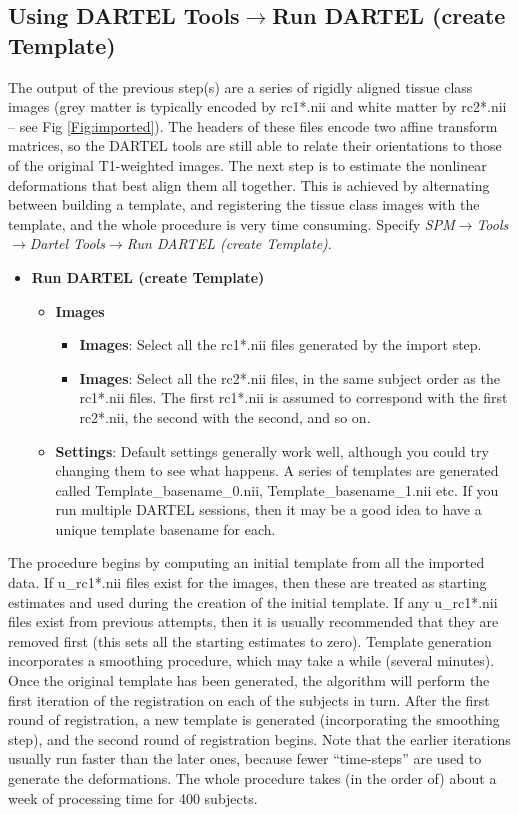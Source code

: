 \subsection{Using DARTEL Tools$\rightarrow$Run DARTEL (create Template)}
The output of the previous step(s) are a series of rigidly aligned tissue class images (grey matter is typically encoded by rc1*.nii and white matter by rc2*.nii -- see Fig \ref{Fig:imported}).
The headers of these files encode two affine transform matrices, so the DARTEL tools are still able to relate their orientations to those of the original T1-weighted images.
The next step is to estimate the nonlinear deformations that best align them all together.
This is achieved by alternating between building a template, and registering the tissue class images with the template, and the whole procedure is very time consuming.
Specify \emph{SPM$\rightarrow$Tools$\rightarrow$Dartel Tools$\rightarrow$Run DARTEL (create Template)}.
\begin{itemize}
\item{{\bf Run DARTEL (create Template)}
  \begin{itemize}
  \item{{\bf Images}
    \begin{itemize}
    \item{{\bf Images}: Select all the rc1*.nii files generated by the import step.
    }
    \item{{\bf Images}: Select all the rc2*.nii files, in the same subject order as the rc1*.nii files. The first rc1*.nii is assumed to correspond with the first rc2*.nii, the second with the second, and so on.
    }
    \end{itemize}
  }
  \item{{\bf Settings}: Default settings generally work well, although you could try changing them to see what happens. A series of templates are generated called Template\_basename\_0.nii, Template\_basename\_1.nii etc.  If you run multiple DARTEL sessions, then it may be a good idea to have a unique template basename for each. 
  }
  \end{itemize}
}
\end{itemize}
The procedure begins by computing an initial template from all the imported data.
If u\_rc1*.nii files exist for the images, then these are treated as starting estimates and used during the creation of the initial template.  If any u\_rc1*.nii files exist from previous attempts, then it is usually recommended that they are removed first (this sets all the starting estimates to zero).
Template generation incorporates a smoothing procedure, which may take a while (several minutes).
Once the original template has been generated, the algorithm will perform the first iteration of the registration on each of the subjects in turn.
After the first round of registration, a new template is generated (incorporating the smoothing step), and the second round of registration begins.
Note that the earlier iterations usually run faster than the later ones, because fewer ``time-steps'' are used to generate the deformations.
The whole procedure takes (in the order of) about a week of processing time for 400 subjects.


